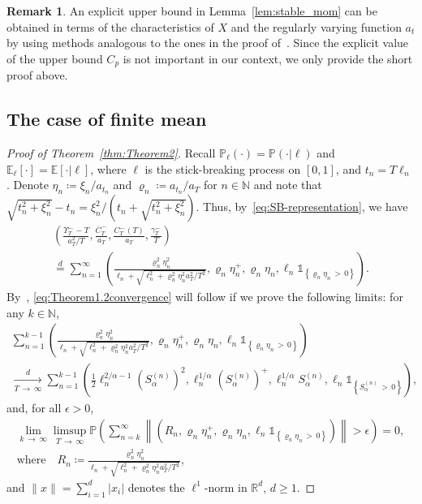 \documentclass[10pt]{amsart}
\theoremstyle{definition}\newtheorem{defi}[theo]{Definition}\newtheorem{rema}[theo]{Remark}\newtheorem{exam}[theo]{Example}\newtheorem{exem}[theo]{Example}\newtheorem{nota}[theo]{Notation}
\newcommand\N{\mathbb{N}}
\newcommand\R{\mathbb{R}}
\newcommand\E{\mathds{E}}
\newcommand\p{\mathds{P}}
\newcommand\1{\mathds{1}}
\newcommand\eqd{\overset{d}{=}}
\newcommand\ov[1]{\overline{#1}}
\begin{document}
\begin{rema}
An explicit upper bound in Lemma~\ref{lem:stable_mom} can be obtained in terms of the characteristics of $X$ and the regularly varying function $a_t$ by using methods analogous to the ones in the proof of~\cite[Lemma~2]{LevySupSim}. Since the explicit value of the upper bound $C_p$ is not important in our context, we only provide the short proof above.
\end{rema}

\subsection{The case of finite mean}

\begin{proof}[Proof of Theorem~\ref{thm:Theorem2}]
Recall $\p_\ell(\cdot)=\p(\cdot|\ell)$ and $\E_\ell[\cdot]=\E[\cdot|\ell]$, where $\ell$ is the stick-breaking process on $[0,1]$, and $t_n=T\ell_n$. Denote $\eta_n\coloneqq\xi_n/a_{t_n}$ and $\varrho_n\coloneqq a_{t_n}/a_T$ for $n\in\N$ and note that $\sqrt{t_n^2+\xi_{n}^2}-t_n =\xi_{n}^2/(t_n+\sqrt{t_n^2+\xi_{n}^2})$. Thus, by~\eqref{eq:SB-representation}, we have
\begin{multline*}
\left(
\frac{\Upsilon_T^\frown-T}{a_T^2/T},
\frac{\ov C_T^\frown}{a_T},
\frac{C_T^\frown(T)}{a_T},
\frac{\gamma_T^\frown}{T}
\right)\\
\eqd
\sum_{n=1}^\infty\left(
\frac{\varrho_n^2\eta_n^2}{\ell_n+\sqrt{\ell_n^2+\varrho_n^2\eta_{n}^2a_T^2/T^2}},\varrho_n\eta_{n}^+,\varrho_n\eta_{n},
\ell_n\1_{\left\{\varrho_n\eta_{n}\,>\,0\right\}}
\right).
\end{multline*}
By~\cite[Theorem~3.2]{BillingsleyConvergence}, \eqref{eq:Theorem1.2convergence} will follow if we prove the following limits: for any $k\in\N$,
\begin{multline}\label{reducedconvergencestable}
\sum_{n=1}^{k-1}\left(
\frac{\varrho_n^2\eta_n^2}{\ell_n+\sqrt{\ell_n^2+\varrho_n^2\eta_{n}^2a_T^2/T^2}},\varrho_n\eta_{n}^+,\varrho_n\eta_{n},
\ell_n\1_{\left\{\varrho_n\eta_{n}\,>\,0\right\}}
\right) \\
\xrightarrow[T\,\to\,\infty]{d}
\sum_{n=1}^{k-1} \left(
\frac{1}{2}\ell_n^{2/\alpha-1}\left(S_\alpha^{(n)}\right)^2,
\ell_n^{1/\alpha} \left(S_\alpha^{(n)}\right)^+,
\ell_n^{1/\alpha} S_\alpha^{(n)},
\ell_n\1_{\left\{S_\alpha^{(n)}\,>\,0\right\}}
\right),
\end{multline}
and, for all $\epsilon>0$,
\begin{multline}\label{limreducedlimitstable}
\lim_{k\,\to\,\infty}\limsup_{T\,\to\,\infty}
\p\left(\sum_{n=k}^\infty\left\|\left(R_n,\varrho_n\eta_{n}^+,\varrho_n\eta_{n},
\ell_n\1_{\left\{\varrho_n\eta_{n}\,>\,0\right\}}
\right)\right\|>\epsilon\right) =0,\\
\text{where}\quad R_n\coloneqq\frac{\varrho_n^2\eta_n^2}{\ell_n+\sqrt{\ell_n^2+\varrho_n^2\eta_n^2a_T^2/T^2}},
\end{multline}
and $\|x\|=\sum_{i=1}^d |x_i|$ denotes the $\ell^1$-norm in $\R^d$, $d\ge 1$.


\end{proof}
\end{document}
